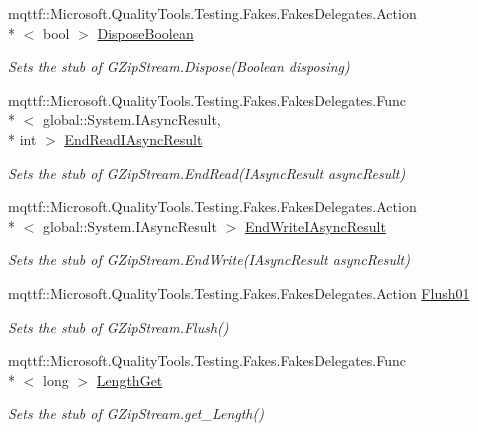 \begin{DoxyCompactItemize}
mqttf\-::\-Microsoft.\-Quality\-Tools.\-Testing.\-Fakes.\-Fakes\-Delegates.\-Action\\*
$<$ bool $>$ \hyperlink{class_system_1_1_i_o_1_1_compression_1_1_fakes_1_1_stub_g_zip_stream_a4837dfa37f8af23d6b6eaac8dc873758}{Dispose\-Boolean}
\begin{DoxyCompactList}\small\item\em Sets the stub of G\-Zip\-Stream.\-Dispose(\-Boolean disposing)\end{DoxyCompactList}\item 
mqttf\-::\-Microsoft.\-Quality\-Tools.\-Testing.\-Fakes.\-Fakes\-Delegates.\-Func\\*
$<$ global\-::\-System.\-I\-Async\-Result, \\*
int $>$ \hyperlink{class_system_1_1_i_o_1_1_compression_1_1_fakes_1_1_stub_g_zip_stream_aa0c7a95941930b09953b4ae0f4599738}{End\-Read\-I\-Async\-Result}
\begin{DoxyCompactList}\small\item\em Sets the stub of G\-Zip\-Stream.\-End\-Read(\-I\-Async\-Result async\-Result)\end{DoxyCompactList}\item 
mqttf\-::\-Microsoft.\-Quality\-Tools.\-Testing.\-Fakes.\-Fakes\-Delegates.\-Action\\*
$<$ global\-::\-System.\-I\-Async\-Result $>$ \hyperlink{class_system_1_1_i_o_1_1_compression_1_1_fakes_1_1_stub_g_zip_stream_a1eae9c44c29178c08f54492d280a6751}{End\-Write\-I\-Async\-Result}
\begin{DoxyCompactList}\small\item\em Sets the stub of G\-Zip\-Stream.\-End\-Write(\-I\-Async\-Result async\-Result)\end{DoxyCompactList}\item 
mqttf\-::\-Microsoft.\-Quality\-Tools.\-Testing.\-Fakes.\-Fakes\-Delegates.\-Action \hyperlink{class_system_1_1_i_o_1_1_compression_1_1_fakes_1_1_stub_g_zip_stream_a60cb85ad5faacaa0eac080e3a64add5f}{Flush01}
\begin{DoxyCompactList}\small\item\em Sets the stub of G\-Zip\-Stream.\-Flush()\end{DoxyCompactList}\item 
mqttf\-::\-Microsoft.\-Quality\-Tools.\-Testing.\-Fakes.\-Fakes\-Delegates.\-Func\\*
$<$ long $>$ \hyperlink{class_system_1_1_i_o_1_1_compression_1_1_fakes_1_1_stub_g_zip_stream_add376a11dcd192c28887492ab508c382}{Length\-Get}
\begin{DoxyCompactList}\small\item\em Sets the stub of G\-Zip\-Stream.\-get\-\_\-\-Length()\end{DoxyCompactList}\item 

\end{DoxyCompactItemize}
